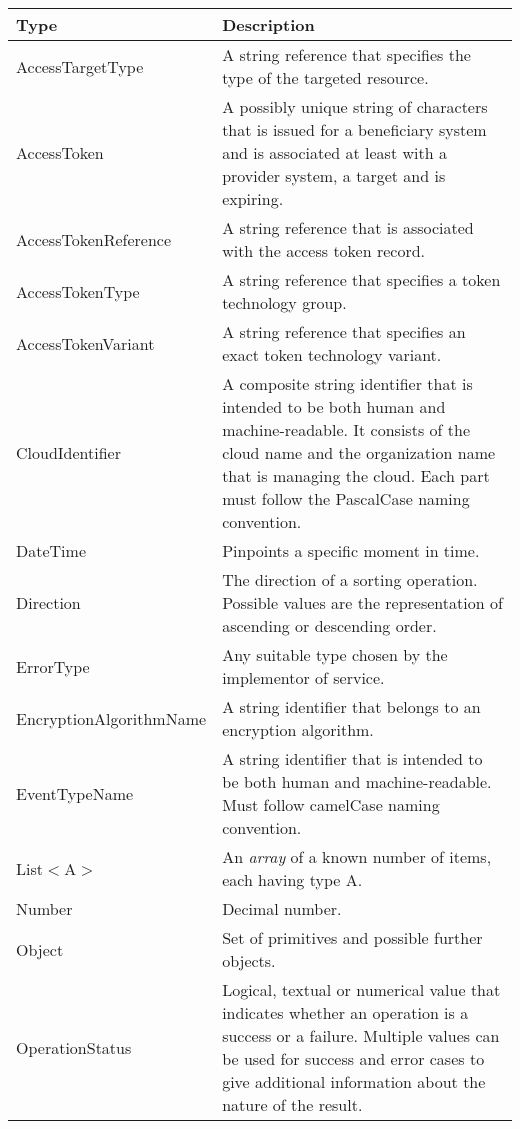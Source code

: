 \documentclass[a4paper]{arrowhead}
\newcommand{\pdef}[1]{{\textcolor{ArrowheadGrey}{#1\label{sec:model:primitives:#1}\label{sec:model:primitives:#1s}\label{sec:model:primitives:#1es}}}}
\begin{document}
\begin{table}[ht!]
\begin{tabularx}{\textwidth}{| p{5cm} | X |} \hline
\rowcolor{gray!33} Type & Description \\ \hline
\pdef{AccessTargetType} & A string reference that specifies the type of the targeted resource. \\ \hline
\pdef{AccessToken} & A possibly unique string of characters that is issued for a beneficiary system and is associated at least with a provider system, a target and is expiring.\\ \hline
\pdef{AccessTokenReference} & A string reference that is associated with the access token record. \\ \hline
\pdef{AccessTokenType} & A string reference that specifies a token technology group.\\ \hline
\pdef{AccessTokenVariant} & A string reference that specifies an exact token technology variant.\\ \hline
\pdef{CloudIdentifier} & A composite string identifier that is intended to be both human and machine-readable. It consists of the cloud name and the organization name that is managing the cloud. Each part must follow the PascalCase naming convention. \\ \hline
\pdef{DateTime}         & Pinpoints a specific moment in time. \\ \hline
\pdef{Direction}        & The direction of a sorting operation. Possible values are the representation of ascending or descending order. \\ \hline
\pdef{ErrorType}        & Any suitable type chosen by the implementor of service. \\ \hline
\pdef{EncryptionAlgorithmName} & A string identifier that belongs to an encryption algorithm. \\ \hline
\pdef{EventTypeName}      & A string identifier that is intended to be both human and machine-readable. Must follow camelCase naming convention. \\ \hline
\pdef{List}$<$A$>$      & An \textit{array} of a known number of items, each having type A. \\ \hline
\pdef{Number}           & Decimal number. \\ \hline
\pdef{Object}           & Set of primitives and possible further objects. \\ \hline
\pdef{OperationStatus}  & Logical, textual or numerical value that indicates whether an operation is a success or a failure. Multiple values can be used for success and error cases to give additional information about the nature of the result. \\ \hline

\end{tabularx}
\end{table}
\end{document}
